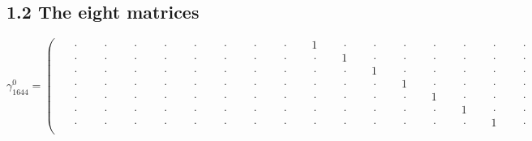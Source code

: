 \documentclass[
  10pt,
]{article}
\begin{document}
\hypertarget{the-eight-matrices}{%
\subsection{1.2 The eight matrices}\label{the-eight-matrices}}

\[
\gamma_{1644}^{0} = \left(\begin{array}{rrrrrrrr|rrrrrrrr}
\phantom{-}\cdot & \phantom{-}\cdot & \phantom{-}\cdot & \phantom{-}\cdot & \phantom{-}\cdot & \phantom{-}\cdot & \phantom{-}\cdot & \phantom{-}\cdot & \phantom{-}1 & \phantom{-}\cdot & \phantom{-}\cdot & \phantom{-}\cdot & \phantom{-}\cdot & \phantom{-}\cdot & \phantom{-}\cdot & \phantom{-}\cdot \\[-1.8pt]
\phantom{-}\cdot & \phantom{-}\cdot & \phantom{-}\cdot & \phantom{-}\cdot & \phantom{-}\cdot & \phantom{-}\cdot & \phantom{-}\cdot & \phantom{-}\cdot & \phantom{-}\cdot & \phantom{-}1 & \phantom{-}\cdot & \phantom{-}\cdot & \phantom{-}\cdot & \phantom{-}\cdot & \phantom{-}\cdot & \phantom{-}\cdot \\[-1.8pt]
\phantom{-}\cdot & \phantom{-}\cdot & \phantom{-}\cdot & \phantom{-}\cdot & \phantom{-}\cdot & \phantom{-}\cdot & \phantom{-}\cdot & \phantom{-}\cdot & \phantom{-}\cdot & \phantom{-}\cdot & \phantom{-}1 & \phantom{-}\cdot & \phantom{-}\cdot & \phantom{-}\cdot & \phantom{-}\cdot & \phantom{-}\cdot \\[-1.8pt]
\phantom{-}\cdot & \phantom{-}\cdot & \phantom{-}\cdot & \phantom{-}\cdot & \phantom{-}\cdot & \phantom{-}\cdot & \phantom{-}\cdot & \phantom{-}\cdot & \phantom{-}\cdot & \phantom{-}\cdot & \phantom{-}\cdot & \phantom{-}1 & \phantom{-}\cdot & \phantom{-}\cdot & \phantom{-}\cdot & \phantom{-}\cdot \\[-1.8pt]
\phantom{-}\cdot & \phantom{-}\cdot & \phantom{-}\cdot & \phantom{-}\cdot & \phantom{-}\cdot & \phantom{-}\cdot & \phantom{-}\cdot & \phantom{-}\cdot & \phantom{-}\cdot & \phantom{-}\cdot & \phantom{-}\cdot & \phantom{-}\cdot & \phantom{-}1 & \phantom{-}\cdot & \phantom{-}\cdot & \phantom{-}\cdot \\[-1.8pt]
\phantom{-}\cdot & \phantom{-}\cdot & \phantom{-}\cdot & \phantom{-}\cdot & \phantom{-}\cdot & \phantom{-}\cdot & \phantom{-}\cdot & \phantom{-}\cdot & \phantom{-}\cdot & \phantom{-}\cdot & \phantom{-}\cdot & \phantom{-}\cdot & \phantom{-}\cdot & \phantom{-}1 & \phantom{-}\cdot & \phantom{-}\cdot \\[-1.8pt]
\phantom{-}\cdot & \phantom{-}\cdot & \phantom{-}\cdot & \phantom{-}\cdot & \phantom{-}\cdot & \phantom{-}\cdot & \phantom{-}\cdot & \phantom{-}\cdot & \phantom{-}\cdot & \phantom{-}\cdot & \phantom{-}\cdot & \phantom{-}\cdot & \phantom{-}\cdot & \phantom{-}\cdot & \phantom{-}1 & \phantom{-}\cdot \\[-1.8pt]

\end{array}\]
\end{document}
